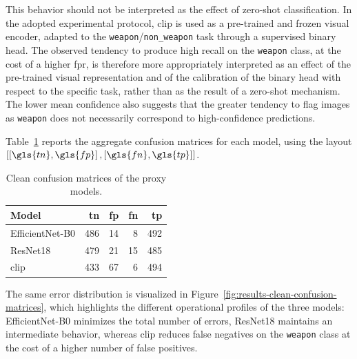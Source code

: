 This behavior should not be interpreted as the effect of zero-shot
classification. In the adopted experimental protocol, \gls{clip} is used as a
pre-trained and frozen visual encoder, adapted to the
\texttt{weapon}/\texttt{non\_weapon} task through a supervised binary head. The
observed tendency to produce high recall on the \texttt{weapon} class, at the
cost of a higher \gls{fpr}, is therefore more appropriately interpreted as an
effect of the pre-trained visual representation and of the calibration of the
binary head with respect to the specific task, rather than as the result of a
zero-shot mechanism. The lower mean confidence also suggests that the greater
tendency to flag images as \texttt{weapon} does not necessarily correspond to
high-confidence predictions.

Table~\ref{tab:results-clean-confusion-matrices} reports the aggregate
confusion matrices for each model, using the layout
\(\left[\left[\gls{tn}, \gls{fp}\right], \left[\gls{fn}, \gls{tp}\right]\right]\).

\begin{table}[H]
\centering
\caption{Clean confusion matrices of the proxy models.}
\label{tab:results-clean-confusion-matrices}
\begin{tabular}{@{}l r r r r@{}}
\toprule
\textbf{Model} & \textbf{\gls{tn}} & \textbf{\gls{fp}} & \textbf{\gls{fn}} & \textbf{\gls{tp}} \\
\midrule
EfficientNet-B0 & 486 & 14 & 8 & 492 \\
ResNet18 & 479 & 21 & 15 & 485 \\
\gls{clip} & 433 & 67 & 6 & 494 \\
\bottomrule
\end{tabular}
\end{table}

The same error distribution is visualized in
Figure~\ref{fig:results-clean-confusion-matrices}, which highlights the
different operational profiles of the three models: EfficientNet-B0 minimizes
the total number of errors, ResNet18 maintains an intermediate behavior,
whereas \gls{clip} reduces false negatives on the \texttt{weapon} class at the
cost of a higher number of false positives.

